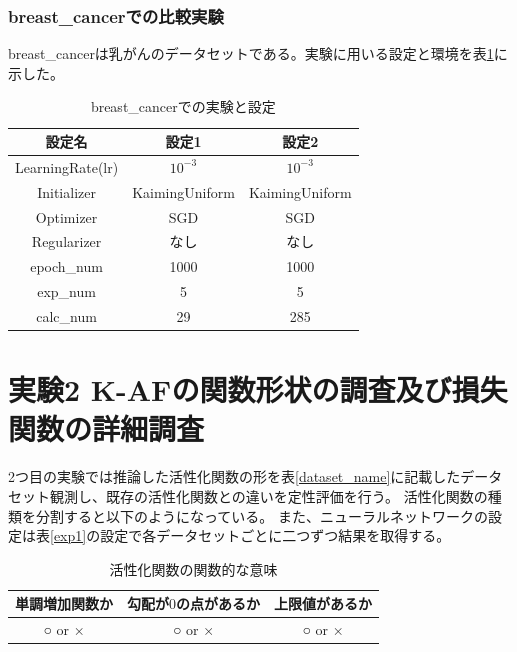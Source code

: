 \subsubsection{breast\_cancerでの比較実験}
\label{impl:breastcancer}

breast\_cancerは乳がんのデータセットである。実験に用いる設定と環境を表\ref{exp:breastcancer}に示した。

\begin{table}[htbp]
    \begin{center}
        \caption{breast\_cancerでの実験と設定}
        \label{exp:breastcancer}
        \vspace{2mm} 
        \begin{tabular}{ |c|c|c| }
        設定名 & 設定1 & 設定2 \\
        \hline
        LearningRate(lr)         & $ 10^{-3} $ & $ 10^{-3} $ \\
        Initializer       & KaimingUniform & KaimingUniform \\
        Optimizer           & SGD & SGD \\
        Regularizer     & なし & なし \\
        epoch\_num       & 1000 &  1000 \\
        exp\_num         & 5 & 5 \\
        calc\_num        & 29 & 285 \\
        \end{tabular}
    \end{center}
\end{table}


\vspace{-5mm} 

\section{実験2 K-AFの関数形状の調査及び損失関数の詳細調査}
\label{exp2}

2つ目の実験では推論した活性化関数の形を表\ref{dataset_name}に記載したデータセット観測し、既存の活性化関数との違いを定性評価を行う。
活性化関数の種類を分割すると以下のようになっている。
また、ニューラルネットワークの設定は表\ref{exp1}の設定で各データセットごとに二つずつ結果を取得する。

\begin{table}[htbp]
    \begin{center}
        \caption{活性化関数の関数的な意味}
        \label{af-class}
        \vspace{2mm} 
        \begin{tabular}{ |c|c|c| }
        \hline
        単調増加関数か & 勾配が$ 0 $の点があるか & 上限値があるか   \\
        \hline
        ○ or × & ○ or × & ○ or ×  \\
        \hline
        \end{tabular}
    \end{center}
\end{table}


